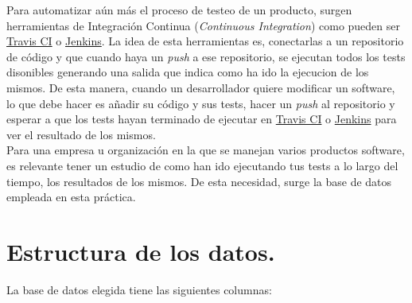 \documentclass[10pt]{article}
\begin{document}
Para automatizar aún más el proceso de testeo de un producto, surgen herramientas de Integración Continua (\textit{Continuous Integration}) como pueden ser \href{https://travis-ci.org/}{Travis CI} o \href{https://jenkins.io/}{Jenkins}. La idea de esta herramientas es, conectarlas a un repositorio de código y que cuando haya un \textit{push} a ese repositorio, se ejecutan todos los tests disonibles generando una salida que indica como ha ido la ejecucion de los mismos. De esta manera, cuando un desarrollador quiere modificar un software, lo que debe hacer es añadir su código y sus tests, hacer un \textit{push} al repositorio y esperar a que los tests hayan terminado de ejecutar en \href{https://travis-ci.org/}{Travis CI} o \href{https://jenkins.io/}{Jenkins} para ver el resultado de los mismos. \\

Para una empresa u organización en la que se manejan varios productos software, es relevante tener un estudio de como han ido ejecutando tus tests a lo largo del tiempo, los resultados de los mismos. De esta necesidad, surge la base de datos empleada en esta práctica.

\section{Estructura de los datos.}

La base de datos elegida tiene las siguientes columnas: 
\end{document}
